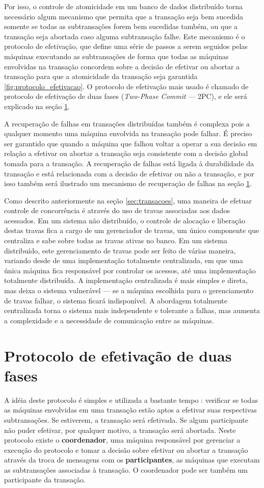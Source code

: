 \documentclass[11pt,twoside,a4paper]{book}
\begin{document}
Por isso, o controle de atomicidade em um banco de dados distribuído torna necessário algum mecanismo que permita que a transação seja bem sucedida somente se todas as subtransações forem bem sucedidas também, ou que a transação seja abortada caso alguma subtransação falhe. Este mecanismo é o protocolo de efetivação, que define uma série de passos a serem seguidos pelas máquinas executando as subtransações de forma que todas as máquinas envolvidas na transação concordem sobre a decisão de efetivar ou abortar a transação para que a atomicidade da transação seja garantida \ref{fig:protocolo_efetivacao}. O protocolo de efetivação mais usado é chamado de protocolo de efetivação de duas fases (\emph{Two-Phase Commit} --- 2PC), e ele será explicado na seção \ref{sec:2pc}.

A recuperação de falhas em transações distribuídas também é complexa pois a qualquer momento uma máquina envolvida na transação pode falhar. É preciso ser garantido que quando a máquina que falhou voltar a operar a sua decisão em relação a efetivar ou abortar a transação seja consistente com a decisão global tomada para a transação. A recuperação de falhas está ligada à durabilidade da transação e está relacionada com a decisão de efetivar ou não a transação, e por isso também será ilustrado um mecanismo de recuperação de falhas na seção \ref{sec:2pc}.

Como descrito anteriormente na seção \ref{sec:transacoes}, uma maneira de efetuar controle de concorrência é através do uso de travas associadas aos dados acessados. Em um sistema não distribuído, o controle de alocação e liberação destas travas fica a cargo de um gerenciador de travas, um único componente que centraliza e sabe sobre todas as travas ativas no banco. Em um sistema distribuído, este gerenciamento de travas pode ser feito de várias maneira, variando desde de uma implementação totalmente centralizada, em que uma única máquina fica responsável por controlar os acessos, até uma implementação totalmente distribuída. A implementação centralizada é mais simples e direta, mas deixa o sistema vulnerável --- se a máquina escolhida para o gerenciamento de travas falhar, o sistema ficará indisponível. A abordagem totalmente centralizada torna o sistema mais independente e tolerante a falhas, mas aumenta a complexidade e a necessidade de comunicação entre as máquinas.

\section{Protocolo de efetivação de duas fases}
\label{sec:2pc}
A idéia deste protocolo é simples e utilizada a bastante tempo \cite{2pc}: verificar se todas as máquinas envolvidas em uma transação estão aptos a efetivar suas respectivas subtransações. Se estiverem, a transação será efetivada. Se algum participante não puder efetivar, por qualquer motivo, a transação será abortada. Neste protocolo existe o \textbf{coordenador}, uma máquina responsável por gerenciar a execução do protocolo e tomar a decisão sobre efetivar ou abortar a transação através da troca de mensagens com os \textbf{participantes}, as máquinas que executam as subtransações associadas à transação. O coordenador pode ser também um participante da transação.
\end{document}
